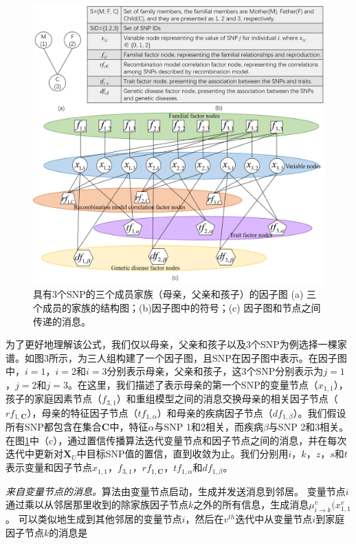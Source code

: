 \begin{figure}[htbp]
	\centering
	\includegraphics[width=0.95\linewidth]{./figures/factor-graph.png}
	\centering
	\caption{具有3个SNP的三个成员家族（母亲，父亲和孩子）的因子图 (a) 三个成员的家族的结构图；(b)因子图中的符号；(c) 因子图和节点之间传递的消息。}\label{fig:factor-graph}
\end{figure}

为了更好地理解该公式，我们仅以母亲，父亲和孩子以及3个SNP为例选择一棵家谱。如图3所示，为三人组构建了一个因子图，且SNP在因子图中表示。在因子图中，$i=1$，$i=2$和$i=3$分别表示母亲，父亲和孩子，这3个SNP分别表示为$j=1$，$j=2$和$j=3$。在这里，我们描述了表示母亲的第一个SNP的变量节点（$x_{1,1}$），孩子的家庭因素节点（$f_{3,1}$）和重组模型之间的消息交换母亲的相关因子节点（$rf_{1,\mathbf{C}}$），母亲的特征因子节点（$tf_{1,\alpha}$）和母亲的疾病因子节点（$df_{1,\beta}$）。我们假设所有SNP都包含在集合$\mathbf{C}$中，特征$\alpha$与SNP 1和2相关，而疾病$\beta$与SNP 2和3相关。在图\ref{fig:factor-graph}中（c），通过置信传播算法迭代变量节点和因子节点之间的消息，并在每次迭代中更新对$\mathbf{X}_U$中目标SNP值的置信，直到收敛为止。我们分别用$i$，$k$，$z$，$s$和$t$表示变量和因子节点$x_{1,1}$，$f_{3,1}$，$rf_{1,\mathbf{C}}$，$tf_{1,\alpha}$和$df_{1,\beta}$。


\emph{来自变量节点的消息。}算法由变量节点启动，生成并发送消息到邻居。 变量节点$i$通过乘以从邻居那里收到的除家族因子节点$k$之外的所有信息，生成消息$\mu_{i \rightarrow k}^v(x_{1,1}^v$。 可以类似地生成到其他邻居的变量节点$i$，然后在$v^{th}$迭代中从变量节点$i$到家庭因子节点$k$的消息是

